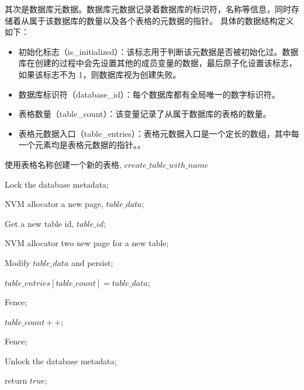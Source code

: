 其次是数据库元数据。数据库元数据记录着数据库的标识符，名称等信息，同时存储着从属于该数据库的数量以及各个表格的元数据的指针。
具体的数据结构定义如下：
\begin{itemize}
    \item 初始化标志（is\_initialized）：该标志用于判断该元数据是否被初始化过。数据库在创建的过程中会先设置其他的成员变量的数据，最后原子化设置该标志，如果该标志不为 1，则数据库视为创建失败。
    \item 数据库标识符（database\_id）：每个数据库都有全局唯一的数字标识符。
    \item 表格数量（table\_count）：该变量记录了从属于数据库的表格的数量。
    \item 表格元数据入口（table\_entries）：表格元数据入口是一个定长的数组，其中每一个元素均是表格元数据的指针。。
\end{itemize}


\begin{algorithm}[ht]
    \caption{使用表格名称创建一个新的表格, $create\_table\_with\_name$}
    \label{alg:create-table}
    \BlankLine
    Lock the database metadata;


    NVM allocator a new page, $table\_data$;

    Get a new table id, $table\_id$;

    NVM allocator two new page for a new table;

    Modify $table\_data$ and persist;

    $table\_entries[table\_count] = table\_data$;

    Fence;

    $table\_count++$;

    Fence;

    Unlock the database metadata;

    return $true$;
\end{algorithm}


